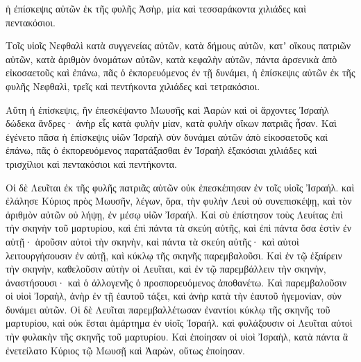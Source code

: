 {ἡ ἐπίσκεψις αὐτῶν ἐκ τῆς φυλῆς Ἀσὴρ, μία καὶ τεσσαράκοντα χιλιάδες καὶ πεντακόσιοι.
\par }{\PP {}Τοῖς υἱοῖς Νεφθαλὶ κατὰ συγγενείας αὐτῶν, κατὰ δήμους αὐτῶν, κατʼ οἴκους πατριῶν αὐτῶν, κατὰ ἀριθμὸν ὀνομάτων αὐτῶν, κατὰ κεφαλὴν αὐτῶν, πάντα ἀρσενικὰ ἀπὸ εἰκοσαετοῦς καὶ ἐπάνω, πᾶς ὁ ἐκπορευόμενος ἐν τῇ δυνάμει,
ἡ ἐπίσκεψις αὐτῶν ἐκ τῆς φυλῆς Νεφθαλὶ, τρεῖς καὶ πεντήκοντα χιλιάδες καὶ τετρακόσιοι.
\par }{\PP {}Αὕτη ἡ ἐπίσκεψις, ἣν ἐπεσκέψαντο Μωυσῆς καὶ Ἀαρὼν καὶ οἱ ἄρχοντες Ἰσραὴλ δώδεκα ἄνδρες· ἀνὴρ εἷς κατὰ φυλὴν μίαν, κατὰ φυλὴν οἴκων πατριᾶς ἦσαν.
Καὶ ἐγένετο πᾶσα ἡ ἐπίσκεψις υἱῶν Ἰσραὴλ σὺν δυνάμει αὐτῶν ἀπὸ εἰκοσαετοῦς καὶ ἐπάνω, πᾶς ὁ ἐκπορευόμενος παρατάξασθαι ἐν Ἰσραὴλ
ἑξακόσιαι χιλιάδες καὶ τρισχίλιοι καὶ πεντακόσιοι καὶ πεντήκοντα.
\par }{\PP {}Οἱ δὲ Λευῖται ἐκ τῆς φυλῆς πατριᾶς αὐτῶν οὐκ ἐπεσκέπησαν ἐν τοῖς υἱοῖς Ἰσραήλ.
καὶ ἐλάλησε Κύριος πρὸς Μωυσῆν, λέγων,
ὅρα, τὴν φυλὴν Λευὶ οὐ συνεπισκέψῃ, καὶ τὸν ἀριθμὸν αὐτῶν οὐ λήψῃ, ἐν μέσῳ υἱῶν Ἰσραήλ.
Καὶ σὺ ἐπίστησον τοὺς Λευίτας ἐπὶ τὴν σκηνὴν τοῦ μαρτυρίου, καὶ ἐπὶ πάντα τὰ σκεύη αὐτῆς, καὶ ἐπὶ πάντα ὅσα ἐστὶν ἐν αὐτῇ· ἀροῦσιν αὐτοὶ τὴν σκηνὴν, καὶ πάντα τὰ σκεύη αὐτῆς· καὶ αὐτοὶ λειτουργήσουσιν ἐν αὐτῇ, καὶ κύκλῳ τῆς σκηνῆς παρεμβαλοῦσι.
Καὶ ἐν τῷ ἐξαίρειν τὴν σκηνὴν, καθελοῦσιν αὐτὴν οἱ Λευῖται, καὶ ἐν τῷ παρεμβάλλειν τὴν σκηνὴν, ἀναστήσουσι· καὶ ὁ ἀλλογενῆς ὁ προσπορευόμενος ἀποθανέτω.
Καὶ παρεμβαλοῦσιν οἱ υἱοὶ Ἰσραὴλ, ἀνὴρ ἐν τῇ ἑαυτοῦ τάξει, καὶ ἀνὴρ κατὰ τὴν ἑαυτοῦ ἡγεμονίαν, σὺν δυνάμει αὐτῶν.
Οἱ δὲ Λευῖται παρεμβαλλέτωσαν ἐναντίοι κύκλῳ τῆς σκηνῆς τοῦ μαρτυρίου, καὶ οὐκ ἔσται ἁμάρτημα ἐν υἱοῖς Ἰσραήλ. καὶ φυλάξουσιν οἱ Λευῖται αὐτοὶ τὴν φυλακὴν τῆς σκηνῆς τοῦ μαρτυρίου.
Καὶ ἐποίησαν οἱ υἱοὶ Ἰσραὴλ, κατὰ πάντα ἃ ἐνετείλατο Κύριος τῷ Μωυσῇ καὶ Ἀαρὼν, οὕτως ἐποίησαν.

}
